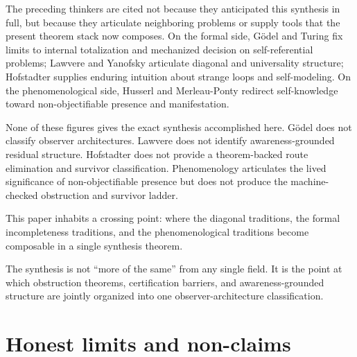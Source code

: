 \documentclass[11pt]{article}
\theoremstyle{plain}
\theoremstyle{definition}
\theoremstyle{remark}
\begin{document}
The preceding thinkers are cited not because they anticipated this
synthesis in full, but because they articulate neighboring problems or
supply tools that the present theorem stack now composes.  On the formal
side, G\"odel and Turing fix limits to internal totalization and mechanized
decision on self-referential problems; Lawvere and Yanofsky articulate
diagonal and universality structure; Hofstadter supplies enduring intuition
about strange loops and self-modeling.  On the phenomenological side,
Husserl and Merleau-Ponty redirect self-knowledge toward non-objectifiable
presence and manifestation.

None of these figures gives the exact synthesis accomplished here.
G\"odel does not classify observer architectures.  Lawvere does not
identify awareness-grounded residual structure.  Hofstadter does not
provide a theorem-backed route elimination and survivor classification.
Phenomenology articulates the lived significance of non-objectifiable
presence but does not produce the machine-checked obstruction and survivor
ladder.

This paper inhabits a crossing point: where the diagonal traditions, the
formal incompleteness traditions, and the phenomenological traditions
become composable in a single synthesis theorem.

\begin{keybox}[title={A crossing point of traditions}]
The synthesis is not ``more of the same'' from any single field.  It is
the point at which obstruction theorems, certification barriers, and
awareness-grounded structure are jointly organized into one
observer-architecture classification.
\end{keybox}

\section{Honest limits and non-claims}
\label{sec:limits}
\end{document}
